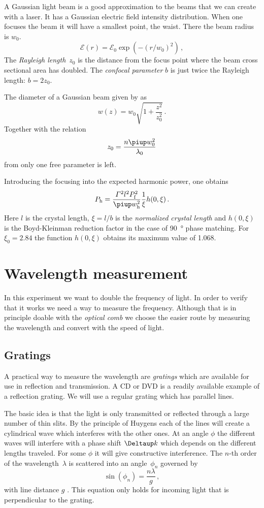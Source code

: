 \documentclass[11pt, english, fleqn, DIV=15, headinclude, BCOR=2cm]{scrreprt}
\begin{document}
A Gaussian light beam is a good approximation to the beams that we can create
with a laser. It has a Gaussian electric field intensity distribution. When one
focuses the beam it will have a smallest point, the waist. There the beam
radius is $w_0$.
\[
    \mathcal E(r) = \mathcal E_0 \exp(-(r/w_0)^2) \,,
\]
The \emph{Rayleigh length}~$z_0$ is the distance from the focus point where the
beam cross sectional area has doubled. The \emph{confocal parameter} $b$ is
just twice the Rayleigh length: $b = 2 z_0$.

The diameter of a Gaussian beam given by \parencite{wikipedia/gaussian_beam} as
\[
    w(z) = w_0 \sqrt{1 + \frac{z^2}{z_0^2}} \,.
\]
Together with the relation
\[
    z_0 = \frac{n \piup w_0^2}{\lambda_0}
\]
from \parencite{wikipedia/rayleighleange} only one free parameter is left.

Introducing the focusing into the expected harmonic power, one obtains
\[
    P_\mathrm h
    = \frac{\Gamma^2 l^2 P_\mathrm f^2}{\piup w_\mathrm h^2} \frac1\xi h(0,
    \xi) \,.
\]
Here $l$ is the crystal length, $\xi = l / b$ is the \emph{normalized crystal
length} and $h(0, \xi)$ is the Boyd-Kleinman reduction factor in the case of
\SI{90}{\degree} phase matching. For $\xi_0 = 2.84$ the function $h(0, \xi)$
obtains its maximum value of \num{1.068}.

\section{Wavelength measurement}

In this experiment we want to double the frequency of light. In order to verify
that it works we need a way to measure the frequency. Although that is in
principle doable with the \emph{optical comb} we choose the easier route by
measuring the wavelength and convert with the speed of light.

\subsection{Gratings}

A practical way to measure the wavelength are \emph{gratings} which are
available for use in reflection and transmission. A CD or DVD is a readily
available example of a reflection grating. We will use a regular grating which
has parallel lines.

The basic idea is that the light is only transmitted or reflected through a
large number of thin slits. By the principle of Huygens each of the lines will
create a cylindrical wave which interferes with the other ones. At an angle
$\phi$ the different waves will interfere with a phase shift $\Deltaup k$ which
depends on the different lengths traveled. For some $\phi$ it will give
constructive interference. The $n$-th order of the wavelength~$\lambda$ is
scattered into an angle~$\phi_n$ governed by
\[
    \sin(\phi_n) = \frac{n \lambda}{g} \,,
\]
with line distance $g$ \parencite{wikipedia/optisches_gitter}. This equation
only holds for incoming light that is perpendicular to the grating.
\end{document}
